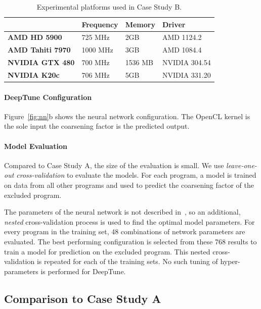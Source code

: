 \begin{table}[t!]
	\centering %
		\begin{tabular}{| l l l l |}
			\hline
			\rowcolor{gray!50}
			& \textbf{Frequency} & \textbf{Memory} & \textbf{Driver} \\
			\hline
			\textbf{AMD HD 5900} & 725 MHz & 2GB & AMD 1124.2 \\
			\textbf{AMD Tahiti 7970} & 1000 MHz & 3GB & AMD 1084.4 \\
			\textbf{NVIDIA GTX 480} & 700 MHz & 1536 MB & NVIDIA 304.54 \\
			\textbf{NVIDIA K20c} & 706 MHz & 5GB & NVIDIA 331.20 \\
			\hline
		\end{tabular}
	  \caption[Experimental platforms used in Case Study B]{%
		Experimental platforms used in Case Study B.%
	}
		\label{tab:pact-platforms}
\end{table}


\paragraph*{DeepTune Configuration}

Figure~\ref{fig:nn}b shows the neural network configuration. The OpenCL kernel is the sole input the coarsening factor is the predicted output.

\paragraph*{Model Evaluation}

Compared to Case Study A, the size of the evaluation is small. We use \emph{leave-one-out cross-validation} to evaluate the models. For each program, a model is trained on data from all other programs and used to predict the coarsening factor of the excluded program.

The parameters of the neural network is not described in~\cite{Magni2014}, so an additional, \emph{nested} cross-validation process is used to find the optimal model parameters. For every program in the training set, 48 combinations of network parameters are evaluated. The best performing configuration is selected from these 768 results to train a model for prediction on the excluded program. This nested cross-validation is repeated for each of the training sets. No such tuning of hyper-parameters is performed for DeepTune.


\subsection{Comparison to Case Study A}

